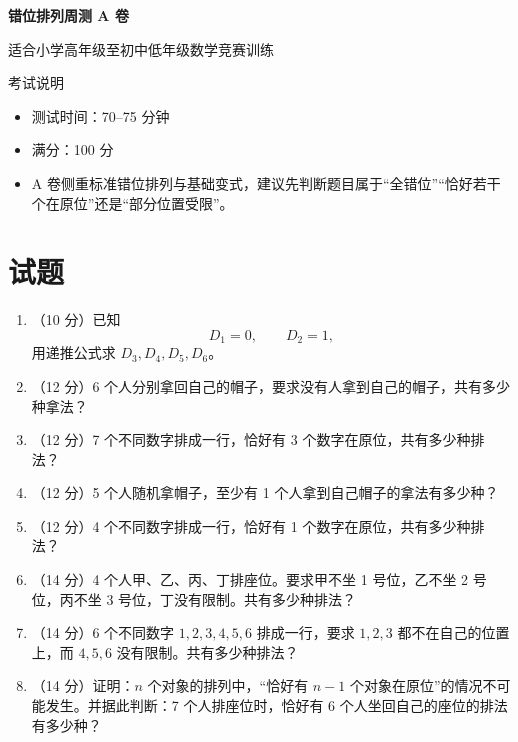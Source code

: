 \documentclass[11pt,a4paper,fontset=fandol]{ctexart}
\newcommand{\answerspace}{\vspace{2.3cm}}
\newcommand{\biganswerspace}{\vspace{3.1cm}}
\begin{document}
\thispagestyle{empty}
\begin{center}
{\fontsize{22}{28}\selectfont\bfseries 错位排列周测 A 卷\par}
\vspace{0.4cm}
{\large 适合小学高年级至初中低年级数学竞赛训练\par}
\end{center}

\begin{infobox}{考试说明}
\begin{itemize}
  \item 测试时间：70--75 分钟
  \item 满分：100 分
  \item A 卷侧重标准错位排列与基础变式，建议先判断题目属于“全错位”“恰好若干个在原位”还是“部分位置受限”。
\end{itemize}
\end{infobox}

\section{试题}

\begin{enumerate}
  \item （10 分）已知
  \[
  D_1=0,\qquad D_2=1,
  \]
  用递推公式求 $D_3,D_4,D_5,D_6$。
  \answerspace

  \item （12 分）6 个人分别拿回自己的帽子，要求没有人拿到自己的帽子，共有多少种拿法？
  \answerspace

  \item （12 分）7 个不同数字排成一行，恰好有 3 个数字在原位，共有多少种排法？
  \answerspace

  \item （12 分）5 个人随机拿帽子，至少有 1 个人拿到自己帽子的拿法有多少种？
  \answerspace

  \item （12 分）4 个不同数字排成一行，恰好有 1 个数字在原位，共有多少种排法？
  \answerspace

  \item （14 分）4 个人甲、乙、丙、丁排座位。要求甲不坐 1 号位，乙不坐 2 号位，丙不坐 3 号位，丁没有限制。共有多少种排法？
  \biganswerspace

  \item （14 分）6 个不同数字 $1,2,3,4,5,6$ 排成一行，要求 $1,2,3$ 都不在自己的位置上，而 $4,5,6$ 没有限制。共有多少种排法？
  \biganswerspace

  \item （14 分）证明：$n$ 个对象的排列中，“恰好有 $n-1$ 个对象在原位”的情况不可能发生。并据此判断：7 个人排座位时，恰好有 6 个人坐回自己的座位的排法有多少种？
  \biganswerspace
\end{enumerate}
\end{document}
